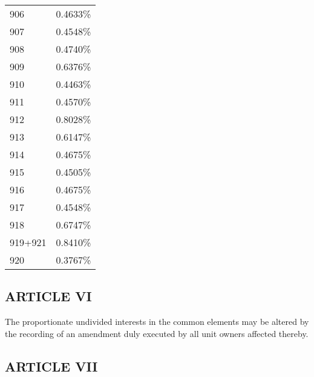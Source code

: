 \documentclass[]{tufte-handout}
\begin{document}
\begin{longtable}[]{@{}ll@{}}
906 & 0.4633\% \\
907 & 0.4548\% \\
908 & 0.4740\% \\
909 & 0.6376\% \\
910 & 0.4463\% \\
911 & 0.4570\% \\
912 & 0.8028\% \\
913 & 0.6147\% \\
914 & 0.4675\% \\
915 & 0.4505\% \\
916 & 0.4675\% \\
917 & 0.4548\% \\
918 & 0.6747\% \\
919+921 & 0.8410\% \\
920 & 0.3767\% \\
\bottomrule
\end{longtable}

\hypertarget{article-vi}{%
\subsection*{ARTICLE VI}\label{article-vi}}

The proportionate undivided interests in the common elements may be
altered by the recording of an amendment duly executed by all unit
owners affected thereby.

\hypertarget{article-vii}{%
\subsection*{ARTICLE VII}\label{article-vii}}
\end{document}
